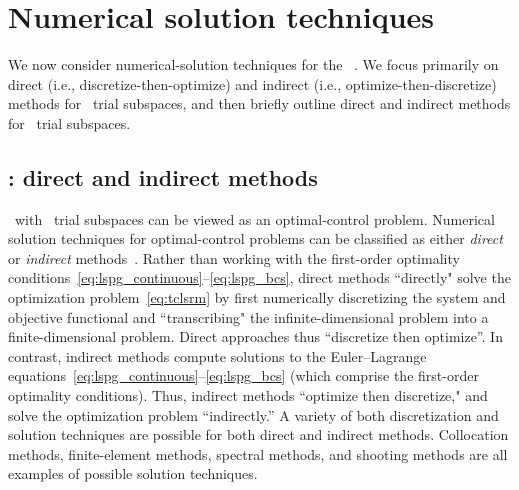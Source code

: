 \section{Numerical solution techniques}\label{sec:numerical_techniques}
We now consider numerical-solution techniques for the \methodAcronym\ \approachKwd.
We focus primarily on 
direct (i.e., discretize-then-optimize) and indirect (i.e., optimize-then-discretize) methods for \spatialAcronym\ trial subspaces, 
and then briefly outline direct and indirect methods for \spaceTimeAcronym\ trial subspaces. 
\subsection{\spatialAcronym: direct and indirect methods}
\methodAcronym\ with \spatialAcronym\ trial subspaces can be viewed as an optimal-control problem.
Numerical solution techniques for
optimal-control problems can be classified as either
\textit{direct} or \textit{indirect}
methods~\cite{conway_optimalcontrolreview}. Rather than working with the first-order optimality conditions~\eqref{eq:lspg_continuous}--\eqref{eq:lspg_bcs}, direct methods ``directly" solve the optimization problem~\eqref{eq:tclsrm} by first
numerically discretizing the system  and objective functional and ``transcribing"
the infinite-dimensional problem into a finite-dimensional 
problem. Direct approaches thus
``discretize then optimize''. 
In contrast, indirect methods compute solutions to the Euler--Lagrange
equations~\eqref{eq:lspg_continuous}--\eqref{eq:lspg_bcs} (which comprise the
first-order optimality conditions).  Thus, indirect methods
``optimize then discretize," and solve the optimization problem
``indirectly.'' A variety of both discretization and solution techniques are possible
for both direct and indirect methods. Collocation methods,
finite-element methods, spectral methods, and shooting methods are all examples of
possible solution techniques.  

